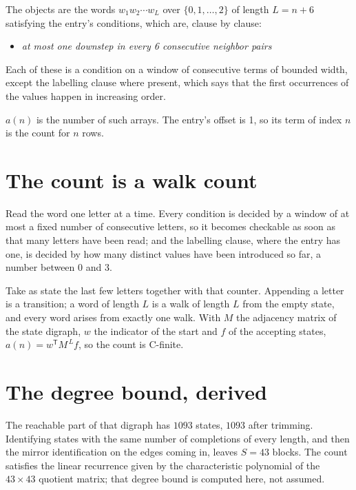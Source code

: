 \documentclass[11pt]{article}
\theoremstyle{definition}
\begin{document}
The objects are the words $w_1 w_2 \cdots w_L$ over $\{0,1,\dots,2\}$ of length $L = n + 6$ satisfying the entry's conditions, which are, clause by clause:

\begin{itemize}

\item {\itshape at most one downstep in every 6 consecutive neighbor pairs}

\end{itemize}

Each of these is a condition on a window of consecutive terms of bounded width, except the labelling clause where present, which says that the first occurrences of the values happen in increasing order.

$a(n)$ is the number of such arrays. The entry's offset is 1, so its term of index $n$ is the count for $n$ rows.

\section{The count is a walk count}

Read the word one letter at a time. Every condition is decided by a window of at most a fixed number of consecutive letters, so it becomes checkable as soon as that many letters have been read; and the labelling clause, where the entry has one, is decided by how many distinct values have been introduced so far, a number between $0$ and 3.

Take as state the last few letters together with that counter. Appending a letter is a transition; a word of length $L$ is a walk of length $L$ from the empty state, and every word arises from exactly one walk. With $M$ the adjacency matrix of the state digraph, $w$ the indicator of the start and $f$ of the accepting states, $a(n) = w^{\mathsf T}M^{\,L}f$, so the count is C-finite.

\section{The degree bound, derived}

The reachable part of that digraph has $1093$ states, $1093$ after trimming. Identifying states with the same number of completions of every length, and then the mirror identification on the edges coming in, leaves $S = 43$ blocks. The count satisfies the linear recurrence given by the characteristic polynomial of the $43\times43$ quotient matrix; that degree bound is computed here, not assumed.
\end{document}
